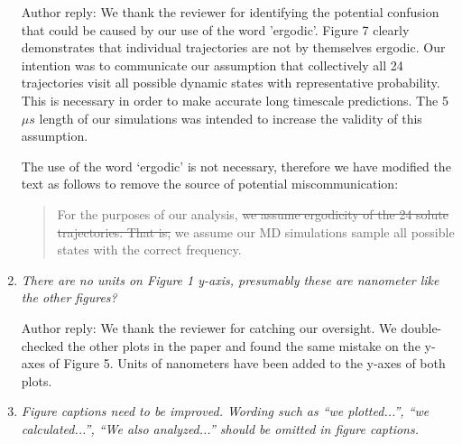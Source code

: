\documentclass{article}
\begin{document}
\begin{enumerate}[label={Comment \theenumi :}, leftmargin=3.9\parindent]
    Author reply: We thank the reviewer for identifying the potential confusion that could be
    caused by our use of the word 'ergodic'. Figure 7 clearly demonstrates that individual trajectories
    are not by themselves ergodic. Our intention was to communicate our assumption that collectively all 24 
    trajectories visit all possible dynamic states with representative probability. This is 
    necessary in order to make accurate long timescale predictions. The 5 $\mu s$ length of our 
    simulations was intended to increase the validity of this assumption. 
    
    The use of the word `ergodic' is not necessary, therefore we have modified the text as follows
    to remove the source of potential miscommunication:
    
    \begin{quote}
    For the purposes of our analysis, \sout{we assume ergodicity of the 24 solute trajectories. That is,}
    we assume our MD simulations sample all possible states with the correct frequency.
    \end{quote}    
    
    \item \textit{There are no units on Figure 1 y-axis, presumably these are nanometer like the 
    other figures?}
    
    Author reply: We thank the reviewer for catching our oversight. We double-checked the 
    other plots in the paper and found the same mistake on the y-axes of Figure 5. Units of nanometers
    have been added to the y-axes of both plots.
    
    \item \textit{Figure captions need to be improved. Wording such as “we plotted...”, “we 
    calculated...”, “We also analyzed...” should be omitted in figure captions.}  


\end{enumerate}
\end{document}
